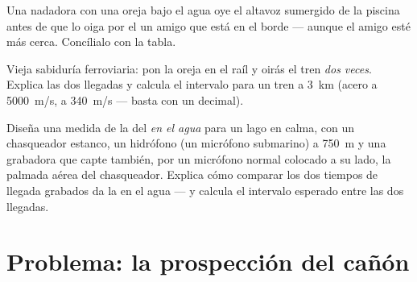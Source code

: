 \begin{exercise}[$\star\star$]\label{exo:g7:sound-production:10}
Una nadadora con una oreja bajo el agua oye el altavoz sumergido de la
piscina antes de que lo oiga por el  un amigo que está en el
borde --- aunque el amigo esté más cerca. Concílialo con la tabla.
\end{exercise}

\begin{exercise}[$\star\star$]\label{exo:g7:sound-production:11}
Vieja sabiduría ferroviaria: pon la oreja en el raíl y oirás el tren
\emph{dos veces}. Explica las dos llegadas y calcula el intervalo para
un tren a \qty{3}{km} (acero a \qty{5000}{m/s},  a
\qty{340}{m/s} --- basta con un decimal).
\end{exercise}

\begin{exercise}[$\star\star\star$]\label{exo:g7:sound-production:12}
Diseña una medida de la  del  \emph{en el agua}
para un lago en calma, con un chasqueador estanco, un hidrófono (un
micrófono submarino) a \qty{750}{m} y una grabadora que capte también,
por un micrófono normal colocado a su lado, la palmada aérea del
chasqueador. Explica cómo comparar los dos tiempos de llegada grabados
da la  en el agua --- y calcula el intervalo esperado entre
las dos llegadas.
\end{exercise}

\section{Problema: la prospección del cañón}


